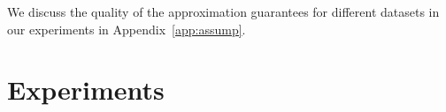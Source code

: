 \documentclass[letterpaper]{article}
\begin{document}
We discuss the quality of the approximation guarantees for different datasets in our experiments in Appendix~\ref{app:assump}.

\newcommand{\dpr}{DP}
\newcommand{\mnist}{MNIST}
\newcommand{\cifar}{CIFAR100}
\newcommand{\ti}{TinyImagenet}

\section{Experiments}
\label{sec:exp}
\end{document}
